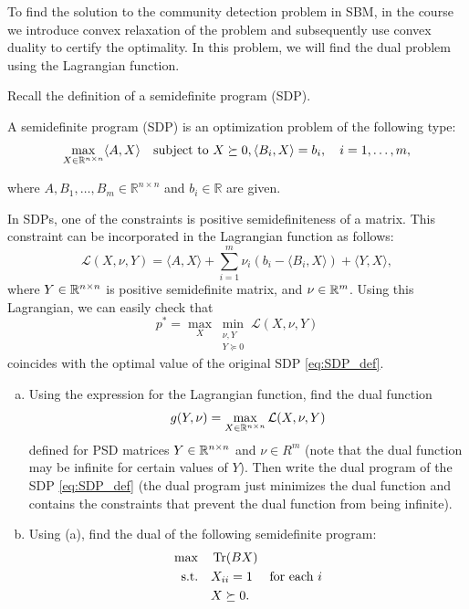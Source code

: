 \begin{myexercise}
    \label{prob:dual_sdp}
       To find the solution to the community detection problem in SBM, in the course we introduce convex relaxation of the problem and subsequently use convex duality to certify the optimality. In this problem, we will find the dual problem using the Lagrangian function. 
    
    Recall the definition of a semidefinite program (SDP).

    \begin{definition}
    A semidefinite program (SDP) is an optimization problem of the following type:
    \begin{equation}\label{eq:SDP_def}
        \max_{X\in \mathbb{R}^{n\times n}} \langle A, X \rangle \quad \text{subject to } X \succeq 0, \langle B_i, X \rangle = b_i,\quad i = 1, \dots, m,
    \end{equation}
    
    
    where $A, B_1, \dots, B_m \in \mathbb{R}^{n \times n}$ and $b_i \in \mathbb{R}$ are given.
    \end{definition}

    In SDPs, one of the constraints is positive semidefiniteness of a matrix. This constraint can be incorporated in the Lagrangian function as follows:
    $$
    \mathcal L(X, \nu, Y) =  \langle A, X \rangle + \sum_{i=1}^m \nu_i ( b_i - \langle B_i, X \rangle) + \langle Y, X \rangle,
    $$
    where $Y \in \mathbb{R}^{n\times n}$ is positive semidefinite matrix, and $\nu \in \mathbb{R}^m$. Using this Lagrangian, we can easily check that 
    $$
    p^* = \max_X \min_{\substack{\nu, Y\\Y \succeq 0}}\mathcal L(X, \nu, Y)
    $$
    coincides with the optimal value of the original SDP \eqref{eq:SDP_def}.
    \begin{enumerate}[(a)]
        \item Using the expression for the Lagrangian function, find the dual function 
        $$
        g(Y, \nu) =  \max_{X\in \mathbb{R}^{n\times n}} \mathcal L(X, \nu, Y)
        $$
        defined for PSD matrices $Y\in \mathbb{R}^{n\times n}$ and $\nu \in R^m$ (note that the dual function may be infinite for certain values of $Y$). Then write the dual program of the SDP \eqref{eq:SDP_def} (the dual program just minimizes the dual function and contains the constraints that prevent the dual function from being infinite). 

        \item Using (a), find the dual of the following semidefinite program: 
        \begin{align*}
        \max\quad &\operatorname{Tr}(BX) \\
        \text{s.t.}\quad &X_{ii} = 1 \quad\text{ for each } i\\
        &X\succeq 0.
        \end{align*}

    \end{enumerate}
    
\end{myexercise}

